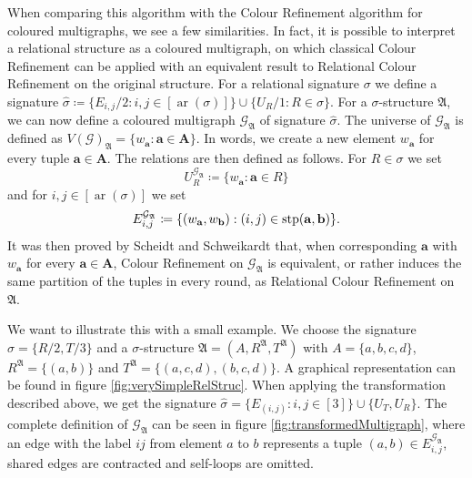 When comparing this algorithm with the Colour Refinement algorithm for coloured multigraphs, we see a few similarities.
In fact, it is possible to interpret a relational structure as a coloured multigraph, on which classical Colour Refinement can be applied with an equivalent result to Relational Colour Refinement on the original structure.
For a relational signature $\sigma$ we define a signature $\widehat{\sigma}\coloneqq \{E_{i,j}/2 : i,j \in [\operatorname{ar}(\sigma)]\} \cup \{U_R/1 : R\in \sigma\}$.
For a $\sigma$-structure $\mathfrak A$, we can now define a coloured multigraph $\mathcal{G}_{\mathfrak A}$ of signature $\widehat{\sigma}$.
The universe of $\mathcal{G}_{\mathfrak A}$ is defined as $V(\mathcal{G})_{\mathfrak A}=\{w_{\mathbf a} : \mathbf a \in \mathbf A\}$.
In words, we create a new element $w_{\mathbf a}$ for every tuple $\mathbf a \in \mathbf A$.
The relations are then defined as follows.
For $R\in \sigma$ we set 
$$U_R^{\mathcal{G}_{\mathfrak A}}\coloneqq \{w_{\mathbf a} : \mathbf a \in R\}$$ 
and for $i,j \in [\operatorname{ar}(\sigma)]$ we set 
$$E_{i,j}^{\mathcal{G}_{\mathfrak A}}\coloneqq \{(w_{\mathbf a}, w_{\mathbf b}) : (i, j) \in \operatorname{stp}(\mathbf a, \mathbf b)\}.$$
It was then proved by Scheidt and Schweikardt \cite{scheidt2025ColorRefinement} that, when corresponding $\mathbf a$ with $w_{\mathbf a}$ for every $\mathbf a\in \mathbf A$, Colour Refinement on $\mathcal{G}_{\mathfrak A}$ is equivalent, or rather induces the same partition of the tuples in every round, as Relational Colour Refinement on $\mathfrak A$.

We want to illustrate this with a small example.
We choose the signature $\sigma=\{R/2, T/3\}$ and a $\sigma$-structure $\mathfrak A=(A,R^{\mathfrak A},T^{\mathfrak A})$ with $A=\{a,b,c,d\}$, $R^{\mathfrak A}=\{(a,b)\}$ and $T^{\mathfrak A}=\{(a,c,d),(b,c,d)\}$.
A graphical representation can be found in figure \ref{fig:verySimpleRelStruc}.
When applying the transformation described above, we get the signature $\widehat{\sigma}=\{E_{(i,j)} : i,j \in [3]\}\cup\{U_T, U_R\}$.
The complete definition of $\mathcal{G}_{\mathfrak A}$ can be seen in figure \ref{fig:transformedMultigraph}, where an edge with the label $ij$ from element $a$ to $b$ represents a tuple $(a,b)\in E_{i,j}^{\mathcal{G}_{\mathfrak A}}$, shared edges are contracted and self-loops are omitted.


